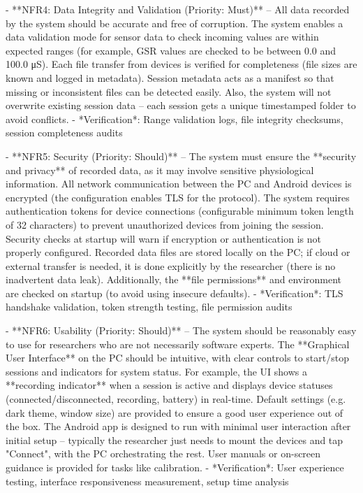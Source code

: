 \documentclass[12pt,a4paper]{article}
\begin{document}
- **NFR4: Data Integrity and Validation (Priority: Must)** -- All data recorded by the system should be accurate and free of corruption. The system enables a data validation mode for sensor data to check incoming values are within expected ranges (for example, GSR values are checked to be between 0.0 and 100.0 μS). Each file transfer from devices is verified for completeness (file sizes are known and logged in metadata). Session metadata acts as a manifest so that missing or inconsistent files can be detected easily. Also, the system will not overwrite existing session data -- each session gets a unique timestamped folder to avoid conflicts.
  - *Verification*: Range validation logs, file integrity checksums, session completeness audits

- **NFR5: Security (Priority: Should)** -- The system must ensure the **security and privacy** of recorded data, as it may involve sensitive physiological information. All network communication between the PC and Android devices is encrypted (the configuration enables TLS for the protocol). The system requires authentication tokens for device connections (configurable minimum token length of 32 characters) to prevent unauthorized devices from joining the session. Security checks at startup will warn if encryption or authentication is not properly configured. Recorded data files are stored locally on the PC; if cloud or external transfer is needed, it is done explicitly by the researcher (there is no inadvertent data leak). Additionally, the **file permissions** and environment are checked on startup (to avoid using insecure defaults).
  - *Verification*: TLS handshake validation, token strength testing, file permission audits

- **NFR6: Usability (Priority: Should)** -- The system should be reasonably easy to use for researchers who are not necessarily software experts. The **Graphical User Interface** on the PC should be intuitive, with clear controls to start/stop sessions and indicators for system status. For example, the UI shows a **recording indicator** when a session is active and displays device statuses (connected/disconnected, recording, battery) in real-time. Default settings (e.g. dark theme, window size) are provided to ensure a good user experience out of the box. The Android app is designed to run with minimal user interaction after initial setup -- typically the researcher just needs to mount the devices and tap "Connect", with the PC orchestrating the rest. User manuals or on-screen guidance is provided for tasks like calibration.
  - *Verification*: User experience testing, interface responsiveness measurement, setup time analysis
\end{document}
